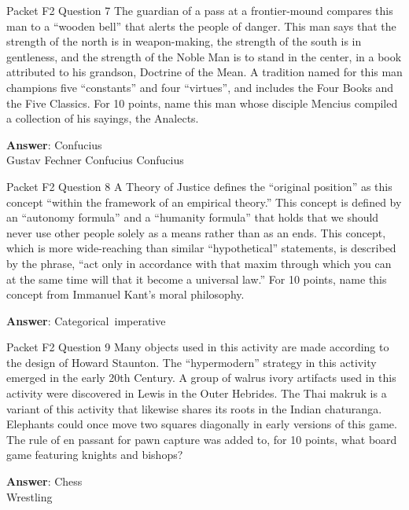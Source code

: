 \begin{frame}{Packet F2 Question 7}
The guardian of a pass at a frontier-mound compares this man to a “wooden bell” that alerts the people of danger. This man says that the strength of the north is in weapon-making, the strength of the south is in gentleness, and the strength of the Noble Man is to stand in the center, in a book attributed to his grandson, Doctrine of the Mean. A tradition named for this man champions five “constants” and four “virtues”, and includes the Four Books and the Five Classics. For 10 points, name this man whose disciple Mencius compiled a collection   of his sayings,   the Analects.    

\textbf{Answer}: Confucius\\
 Gustav Fechner
 Confucius
 Confucius
\end{frame}

\begin{frame}{Packet F2 Question 8}
A Theory of Justice defines the “original position” as this concept “within the framework of an empirical theory.” This concept is defined by an “autonomy formula” and a “humanity formula” that holds that   we should never use other people solely as a means rather than as an ends. This concept, which is more wide-reaching than similar “hypothetical” statements, is described by the phrase, “act only in accordance with that maxim through which you can at the same time will that it become a universal law.”   For 10 points,   name this concept from Immanuel Kant’s moral   philosophy.

\textbf{Answer}: Categorical\ imperative\\
\end{frame}

\begin{frame}{Packet F2 Question 9}
Many objects used in this activity are made according to the design of Howard Staunton. The “hypermodern” strategy in this activity emerged in the early 20th Century. A group of walrus ivory artifacts used in this activity were discovered in Lewis in the Outer Hebrides. The Thai makruk is a variant of this activity that likewise shares its roots in the Indian chaturanga. Elephants could once move two squares diagonally in early versions of this game. The rule   of en passant for   pawn capture was added to, for 10 points, what board game featuring   knights and bishops?  

\textbf{Answer}: Chess\\
 Wrestling
\end{frame}

